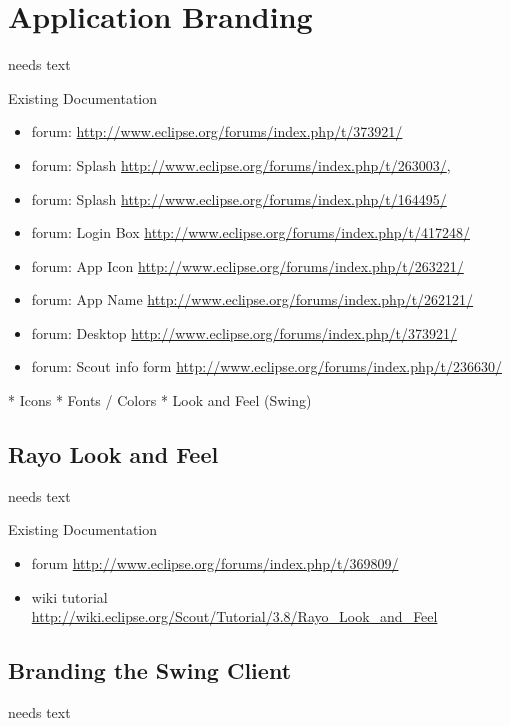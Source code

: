 \documentclass[a4paper,10pt,twoside]{book}
\begin{document}
\chapter{Application Branding}
needs text

\noindent Existing Documentation
\begin{itemize}
  \item forum: \url{http://www.eclipse.org/forums/index.php/t/373921/}
  \item forum: Splash \url{http://www.eclipse.org/forums/index.php/t/263003/}, 
  \item forum: Splash \url{http://www.eclipse.org/forums/index.php/t/164495/}
  \item forum: Login Box \url{http://www.eclipse.org/forums/index.php/t/417248/}
  \item forum: App Icon \url{http://www.eclipse.org/forums/index.php/t/263221/}
  \item forum: App Name \url{http://www.eclipse.org/forums/index.php/t/262121/}
  \item forum: Desktop \url{http://www.eclipse.org/forums/index.php/t/373921/}
  \item forum: Scout info form \url{http://www.eclipse.org/forums/index.php/t/236630/}
\end{itemize}

* Icons
* Fonts / Colors
* Look and Feel (Swing)

\section{Rayo Look and Feel}
needs text

\noindent Existing Documentation
\begin{itemize}
  \item forum \url{http://www.eclipse.org/forums/index.php/t/369809/}
  \item wiki tutorial \url{http://wiki.eclipse.org/Scout/Tutorial/3.8/Rayo_Look_and_Feel}
\end{itemize}

\section{Branding the Swing Client}
needs text
\end{document}
